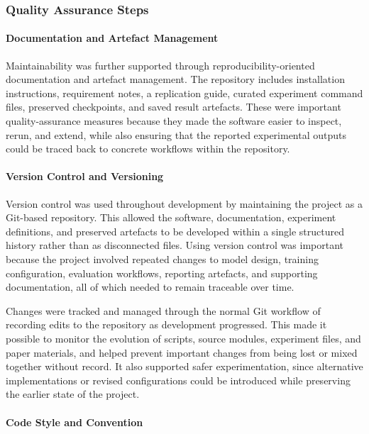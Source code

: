 ﻿\documentclass[11pt,a4paper]{article}
\begin{document}
\subsubsection{Quality Assurance Steps}

\paragraph*{Documentation and Artefact Management}

Maintainability was further supported through reproducibility-oriented
documentation and artefact management. The repository includes installation
instructions, requirement notes, a replication guide, curated experiment
command files, preserved checkpoints, and saved result artefacts. These were
important quality-assurance measures because they made the software easier to
inspect, rerun, and extend, while also ensuring that the reported
experimental outputs could be traced back to concrete workflows within the
repository.

\paragraph*{Version Control and Versioning}

Version control was used throughout development by maintaining the project as
a Git-based repository. This allowed the software, documentation, experiment
definitions, and preserved artefacts to be developed within a single
structured history rather than as disconnected files. Using version control
was important because the project involved repeated changes to model design,
training configuration, evaluation workflows, reporting artefacts, and
supporting documentation, all of which needed to remain traceable over time.

\medskip

\noindent
Changes were tracked and managed through the normal Git workflow of recording
edits to the repository as development progressed. This made it possible to
monitor the evolution of scripts, source modules, experiment files, and paper
materials, and helped prevent important changes from being lost or mixed
together without record. It also supported safer experimentation, since
alternative implementations or revised configurations could be introduced
while preserving the earlier state of the project.

\paragraph*{Code Style and Convention}
\end{document}
